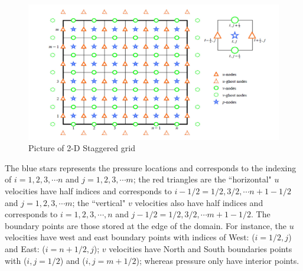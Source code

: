\begin{figure}[H]
	\centering
	\includegraphics[width=6.5in]{figures/staggered_grid.jpg}
	\caption{Picture of 2-D Staggered grid}\label{fig:6.1}
\end{figure}
The blue stars represents the pressure locations and corresponds to the indexing of $i = 1,2,3,\cdots n$ and $j = 1,2,3,\cdots m$; the red triangles are the ``horizontal" $u$ velocities have half indices and corresponds to $i-1/2 = 1/2, 3/2, \cdots n+1-1/2$ and $j=1,2,3,\cdots m$; the ``vertical" $v$ velocities also have half indices and corresponds to $i = 1,2,3,\cdots, n$ and $j-1/2 = 1/2, 3/2, \cdots m+1-1/2$. The boundary points are those stored at the edge of the domain. For instance, the $u$ velocities have west and east boundary points with indices of West: ($i=1/2,j$) and East: ($i=n+1/2,j$); $v$ velocities have North and South boundaries points with ($i,j=1/2$) and ($i,j=m+1/2$); whereas pressure only have interior points.\\

